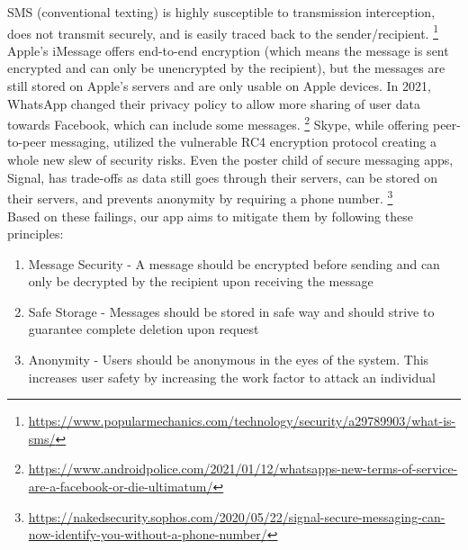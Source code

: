 \documentclass[titlepage]{article}
\begin{document}
      SMS (conventional texting) is highly susceptible to transmission interception, does not transmit securely, and is easily traced back to the sender/recipient.
      \footnote{\url{https://www.popularmechanics.com/technology/security/a29789903/what-is-sms/}}
      Apple's iMessage offers end-to-end encryption (which means the message is sent encrypted and can only be unencrypted by the recipient), but the messages are still stored on Apple's servers and are only usable on Apple devices.
      In 2021, WhatsApp changed their privacy policy to allow more sharing of user data towards Facebook, which can include some messages.
      \footnote{\url{https://www.androidpolice.com/2021/01/12/whatsapps-new-terms-of-service-are-a-facebook-or-die-ultimatum/}}
      Skype, while offering peer-to-peer messaging, utilized the vulnerable RC4 encryption protocol creating a whole new slew of security risks.
      Even the poster child of secure messaging apps, Signal, has trade-offs as data still goes through their servers, can be stored on their servers, and prevents anonymity by requiring a phone number.
      \footnote{\url{https://nakedsecurity.sophos.com/2020/05/22/signal-secure-messaging-can-now-identify-you-without-a-phone-number/}}\\

      Based on these failings, our app aims to mitigate them by following these principles:
      \begin{enumerate}
          \item Message Security - A message should be encrypted before sending and can only be decrypted by the recipient upon receiving the message
          \item Safe Storage - Messages should be stored in safe way and should strive to guarantee complete deletion upon request
          \item Anonymity - Users should be anonymous in the eyes of the system. This increases user safety by increasing the work factor to attack an individual
      \end{enumerate}
\end{document}
